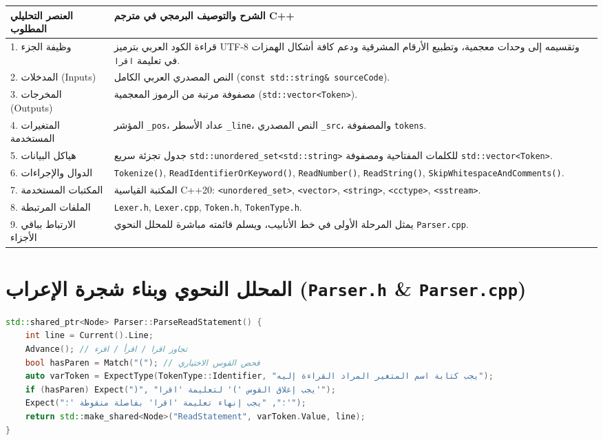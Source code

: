 \documentclass[11pt,a4paper,oneside]{report}
\begin{document}
\begin{longtable}{|p{4.2cm}|p{12.2cm}|}
\hline
\rowcolor{NavyBlue}\color{white}\textbf{\arabicfont العنصر التحليلي المطلوب} & \rowcolor{NavyBlue}\color{white}\textbf{\arabicfont الشرح والتوصيف البرمجي في مترجم C++} \\
\hline
\endhead
1. وظيفة الجزء & قراءة الكود العربي بترميز UTF-8 وتقسيمه إلى وحدات معجمية، وتطبيع الأرقام المشرقية ودعم كافة أشكال الهمزات في تعليمة \texttt{اقرا}. \\
\hline
2. المدخلات (Inputs) & النص المصدري العربي الكامل (\texttt{const std::string\& sourceCode}). \\
\hline
3. المخرجات (Outputs) & مصفوفة مرتبة من الرموز المعجمية (\texttt{std::vector<Token>}). \\
\hline
4. المتغيرات المستخدمة & المؤشر \texttt{\_pos}، عداد الأسطر \texttt{\_line}، النص المصدري \texttt{\_src}، والمصفوفة \texttt{tokens}. \\
\hline
5. هياكل البيانات & جدول تجزئة سريع \texttt{std::unordered\_set<std::string>} للكلمات المفتاحية ومصفوفة \texttt{std::vector<Token>}. \\
\hline
6. الدوال والإجراءات & \texttt{Tokenize()}, \texttt{ReadIdentifierOrKeyword()}, \texttt{ReadNumber()}, \texttt{ReadString()}, \texttt{SkipWhitespaceAndComments()}. \\
\hline
7. المكتبات المستخدمة & المكتبة القياسية C++20: \texttt{<unordered\_set>}, \texttt{<vector>}, \texttt{<string>}, \texttt{<cctype>}, \texttt{<sstream>}. \\
\hline
8. الملفات المرتبطة & \texttt{Lexer.h}, \texttt{Lexer.cpp}, \texttt{Token.h}, \texttt{TokenType.h}. \\
\hline
9. الارتباط بباقي الأجزاء & يمثل المرحلة الأولى في خط الأنابيب، ويسلم قائمته مباشرة للمحلل النحوي \texttt{Parser.cpp}. \\
\hline
\end{longtable}

\section{المحلل النحوي وبناء شجرة الإعراب (\texttt{Parser.h} \& \texttt{Parser.cpp})}
\begin{tcolorbox}[colback=BgLight,colframe=BorderGray,title={\small\arabicfont مقطع من المحلل النحوي في C++20 وإعراب تعليمة اقرا}]
\begin{lstlisting}[language=C++]
std::shared_ptr<Node> Parser::ParseReadStatement() {
    int line = Current().Line;
    Advance(); // تجاوز اقرا / اقرأ / اقرء
    bool hasParen = Match("("); // فحص القوس الاختياري
    auto varToken = ExpectType(TokenType::Identifier, "يجب كتابة اسم المتغير المراد القراءة إليه");
    if (hasParen) Expect(")", "يجب إغلاق القوس ')' لتعليمة 'اقرا'");
    Expect("؛", "يجب إنهاء تعليمة 'اقرا' بفاصلة منقوطة '؛'");
    return std::make_shared<Node>("ReadStatement", varToken.Value, line);
}
\end{lstlisting}
\end{tcolorbox}
\end{document}
